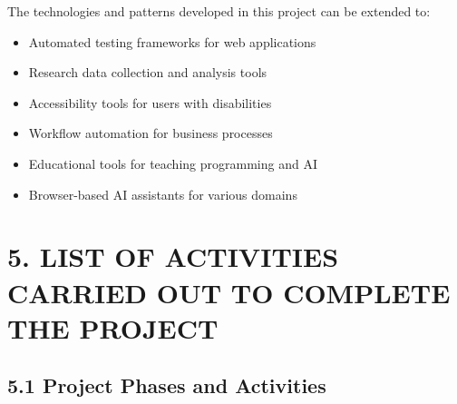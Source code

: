 \documentclass[12pt,a4paper]{article}
\begin{document}
The technologies and patterns developed in this project can be extended to:

\begin{itemize}
    \item Automated testing frameworks for web applications
    \item Research data collection and analysis tools
    \item Accessibility tools for users with disabilities
    \item Workflow automation for business processes
    \item Educational tools for teaching programming and AI
    \item Browser-based AI assistants for various domains
\end{itemize}

\newpage

\section*{\textbf{5. LIST OF ACTIVITIES CARRIED OUT TO COMPLETE THE PROJECT}}

\subsection*{\textbf{5.1 Project Phases and Activities}}
\end{document}
